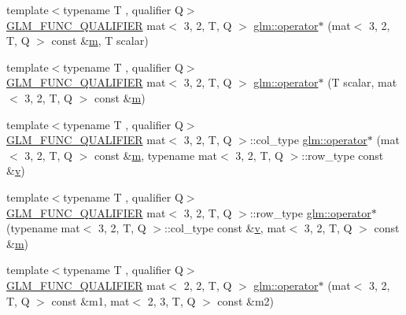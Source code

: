 \begin{DoxyCompactItemize}
\item 
{\footnotesize template$<$typename T , qualifier Q$>$ }\\\hyperlink{setup_8hpp_a33fdea6f91c5f834105f7415e2a64407}{G\+L\+M\+\_\+\+F\+U\+N\+C\+\_\+\+Q\+U\+A\+L\+I\+F\+I\+ER} mat$<$ 3, 2, T, Q $>$ \hyperlink{namespaceglm_a7cc820630c7977b58edacb1445979aaf}{glm\+::operator$\ast$} (mat$<$ 3, 2, T, Q $>$ const \&\hyperlink{_s_d_l__opengl__glext_8h_af593500c283bf1a787a6f947f503a5c2}{m}, T scalar)
\item 
{\footnotesize template$<$typename T , qualifier Q$>$ }\\\hyperlink{setup_8hpp_a33fdea6f91c5f834105f7415e2a64407}{G\+L\+M\+\_\+\+F\+U\+N\+C\+\_\+\+Q\+U\+A\+L\+I\+F\+I\+ER} mat$<$ 3, 2, T, Q $>$ \hyperlink{namespaceglm_af0e8aff249431ecfc857868c5a4d7035}{glm\+::operator$\ast$} (T scalar, mat$<$ 3, 2, T, Q $>$ const \&\hyperlink{_s_d_l__opengl__glext_8h_af593500c283bf1a787a6f947f503a5c2}{m})
\item 
{\footnotesize template$<$typename T , qualifier Q$>$ }\\\hyperlink{setup_8hpp_a33fdea6f91c5f834105f7415e2a64407}{G\+L\+M\+\_\+\+F\+U\+N\+C\+\_\+\+Q\+U\+A\+L\+I\+F\+I\+ER} mat$<$ 3, 2, T, Q $>$\+::col\+\_\+type \hyperlink{namespaceglm_a2c7e7d65d33a6767060defe03c59c606}{glm\+::operator$\ast$} (mat$<$ 3, 2, T, Q $>$ const \&\hyperlink{_s_d_l__opengl__glext_8h_af593500c283bf1a787a6f947f503a5c2}{m}, typename mat$<$ 3, 2, T, Q $>$\+::row\+\_\+type const \&\hyperlink{_s_d_l__opengl_8h_a10a82eabcb59d2fcd74acee063775f90}{v})
\item 
{\footnotesize template$<$typename T , qualifier Q$>$ }\\\hyperlink{setup_8hpp_a33fdea6f91c5f834105f7415e2a64407}{G\+L\+M\+\_\+\+F\+U\+N\+C\+\_\+\+Q\+U\+A\+L\+I\+F\+I\+ER} mat$<$ 3, 2, T, Q $>$\+::row\+\_\+type \hyperlink{namespaceglm_a5ed2536927f15d0188a061a89a2aafb3}{glm\+::operator$\ast$} (typename mat$<$ 3, 2, T, Q $>$\+::col\+\_\+type const \&\hyperlink{_s_d_l__opengl_8h_a10a82eabcb59d2fcd74acee063775f90}{v}, mat$<$ 3, 2, T, Q $>$ const \&\hyperlink{_s_d_l__opengl__glext_8h_af593500c283bf1a787a6f947f503a5c2}{m})
\item 
{\footnotesize template$<$typename T , qualifier Q$>$ }\\\hyperlink{setup_8hpp_a33fdea6f91c5f834105f7415e2a64407}{G\+L\+M\+\_\+\+F\+U\+N\+C\+\_\+\+Q\+U\+A\+L\+I\+F\+I\+ER} mat$<$ 2, 2, T, Q $>$ \hyperlink{namespaceglm_a027c17cbc40f738d26c9c9897a537344}{glm\+::operator$\ast$} (mat$<$ 3, 2, T, Q $>$ const \&m1, mat$<$ 2, 3, T, Q $>$ const \&m2)

\end{DoxyCompactItemize}
